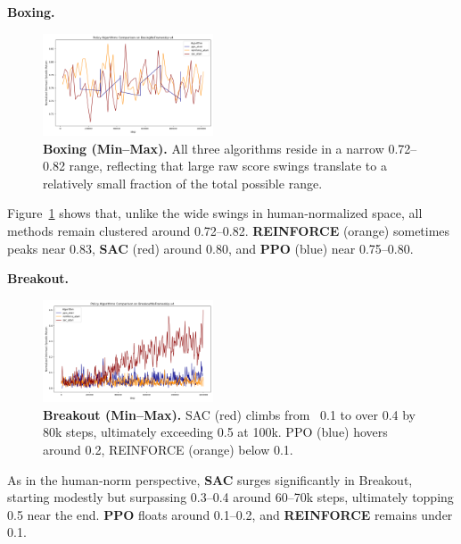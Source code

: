 \medskip

\textbf{Boxing.}
\begin{figure}[htbp]
	\centering
	\includegraphics[width=0.45\textwidth]{figures/policy_comparison/charts_episodic_return_minmax_comparison_BoxingNoFrameskip-v4_policy.png}
	\caption{\textbf{Boxing (Min--Max).} All three algorithms reside in a narrow 0.72--0.82 range, reflecting that large raw score swings translate to a relatively small fraction of the total possible range.}
	\label{fig:policy_minmax_boxing}
\end{figure}

Figure~\ref{fig:policy_minmax_boxing} shows that, unlike the wide swings in human‐normalized space, all methods remain clustered around 0.72--0.82. \textbf{REINFORCE} (orange) sometimes peaks near 0.83, \textbf{SAC} (red) around 0.80, and \textbf{PPO} (blue) near 0.75--0.80.

\medskip

\textbf{Breakout.}
\begin{figure}[htbp]
	\centering
	\includegraphics[width=0.45\textwidth]{figures/policy_comparison/charts_episodic_return_minmax_comparison_BreakoutNoFrameskip-v4_policy.png}
	\caption{\textbf{Breakout (Min--Max).} SAC (red) climbs from ~0.1 to over 0.4 by 80k steps, ultimately exceeding 0.5 at 100k. PPO (blue) hovers around 0.2, REINFORCE (orange) below 0.1.}
	\label{fig:policy_minmax_breakout}
\end{figure}

As in the human‐norm perspective, \textbf{SAC} surges significantly in Breakout, starting modestly but surpassing 0.3--0.4 around 60--70k steps, ultimately topping 0.5 near the end. \textbf{PPO} floats around 0.1--0.2, and \textbf{REINFORCE} remains under 0.1.

